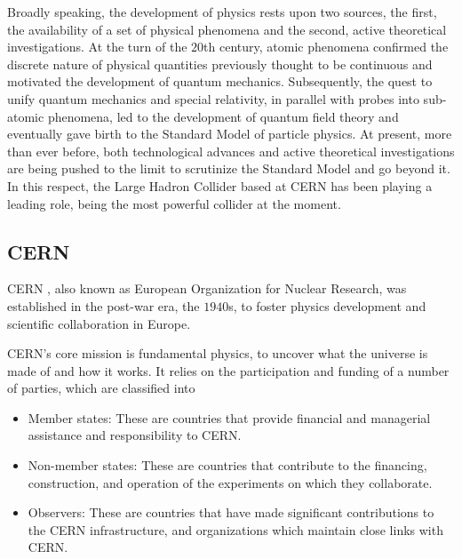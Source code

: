 Broadly speaking, the development of physics rests upon two sources, the first,
the availability of a set of physical phenomena and the second, active
theoretical investigations. At the turn of the $20$th century, atomic phenomena
confirmed the discrete nature of physical quantities previously thought to be
continuous and motivated the development of quantum mechanics. Subsequently,
the quest to unify quantum mechanics and special relativity, in parallel with
probes into sub-atomic phenomena, led to the development of quantum field
theory and eventually gave birth to the Standard Model of particle physics. At
present, more than ever before, both technological advances and active
theoretical investigations are being pushed to the limit to scrutinize the
Standard Model and go beyond it. In this respect, the Large Hadron Collider
based at CERN has been playing a leading role, being the most powerful collider
at the moment.



\subsection{CERN}

CERN \cite{cernlink}, also known as European Organization for Nuclear Research,
was established in the post-war era, the $1940$s, to foster physics development
and scientific collaboration in Europe.

CERN's core mission is fundamental physics, to uncover what the universe is
made of and how it works. It relies on the participation and funding of a
number of parties, which are classified into

\begin{itemize}

	\item Member states: These are countries that provide financial and managerial
	      assistance and responsibility to CERN.

	\item Non-member states: These are countries that contribute to the financing,
	      construction, and operation of the experiments on which they collaborate.

	\item Observers: These are countries that have made significant contributions
	      to the CERN infrastructure, and organizations which maintain close links with
	      CERN.

\end{itemize}

